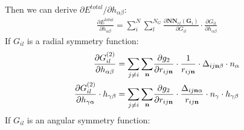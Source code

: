 \documentclass[final,1p,times]{elsarticle}
\begin{document}
\newcommand{\hab}{h_{\alpha\beta}}
\newcommand{\hga}{h_{\gamma\alpha}}
\newcommand{\hgb}{h_{\gamma\beta}}

Then we can derive $\partial E^{total} / \partial \hab$:
\begin{align}
\label{eq:dEdhab}
\frac{\partial E^{total}}{\partial \hab} = \sum_{i}^{N}{\sum_{l}^{N_G}}{
    \frac{\partial \mathbf{NN}_{el}(\mathbf{G}_i)}{\partial G_{il}}
    \cdot
    \frac{\partial G_{il}}{\partial \hab}
}
\end{align}
If $G_{il}$ is a radial symmetry function:
\begin{align}
\frac{\partial G_{il}^{(2)}}{\partial \hab} 
& = \sum_{j \neq i}{\sum_{\mathbf{n}}}{
    \frac{\partial g_2}{\partial \rijn} 
    \cdot 
    \frac{1}{\rijn} \cdot \Delta_{ij\mathbf{n}\beta} \cdot n_{\alpha}
} \\
\label{eq:stress_g2_right}
\frac{\partial G_{il}^{(2)}}{\partial \hga} \cdot \hgb & = 
\sum_{j \neq i}{\sum_{\mathbf{n}}}{
    \frac{\partial g_2}{\partial \rijn} 
    \cdot 
    \frac{\Delta_{ij\mathbf{n}\alpha}}{\rijn} \cdot n_{\gamma}
} \cdot \hgb
\end{align}
If $G_{il}$ is an angular symmetry function:
\end{document}
